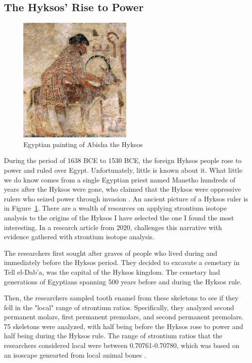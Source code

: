 \documentclass[a4paper, 12pt]{article}
\begin{document}
\subsection{The Hyksos' Rise to Power}

\begin{figure}[htbp]
    \centering
    \includegraphics[width=0.5\textwidth]{hyksos_painting.jpg}
    \caption{Egyptian painting of Abisha the Hyksos \citep{wikipediaHyksos}}
    \label{fig:hyksos_painting}
\end{figure}
During the period of 1638 BCE to 1530 BCE, the foreign Hyksos people rose to power
and ruled over Egypt. Unfortunately, little is known about it. What little we do know comes
from a single Egyptian priest named Manetho hundreds of years after the Hyksos were gone,
who claimed that the Hyksos were oppressive rulers who seized power through invasion \citep{stantis2020}.
An ancient picture of a Hyksos ruler is in Figure~\ref{fig:hyksos_painting}. There are a wealth
of resources on applying strontium isotope analysis to the origins of the Hyksos \citep*{stantis2020, stantis2021, weinstein2021, maaranen2019}
I have selected the one I found the most interesting. In a research article from 2020, \cite{stantis2020} challenges this narrative
with evidence gathered with strontium isotope analysis.

The researchers first sought after graves of people who lived during and immediately
before the Hyksos period. They decided to excavate a cemetary in Tell el-Dab'a,
was the capital of the Hyksos kingdom. The cemetary had generations of Egyptians spanning
500 years before and during the Hyksos rule.

Then, the researchers sampled tooth enamel from these skeletons to see if they fell
in the "local" range of strontium ratios. Specifically, they analyzed second permanent molars,
first permanent premolars, and second permanent premolars. 75 skeletons were analyzed,
with half being before the Hyksos rose to power and half being during the Hyksos rule.
The range of strontium ratios that the researchers considered local were
between 0.70761-0.70780, which was based on an isoscape genearted from local animal bones \citep{bournemouth2020}.
\end{document}
